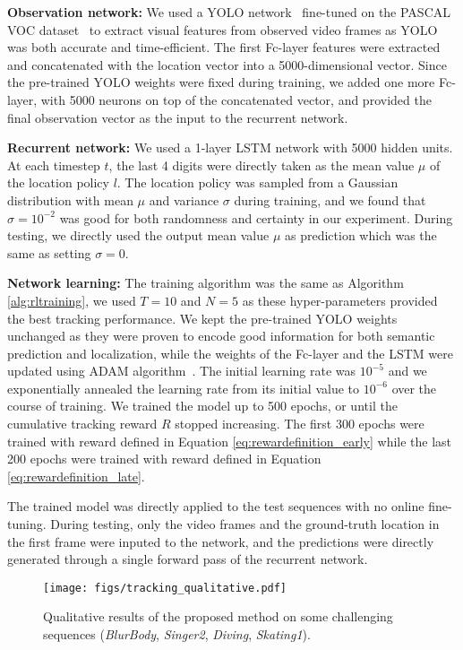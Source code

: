 \documentclass[10pt,twocolumn,letterpaper]{article}
\begin{document}
\textbf{Observation network:} We used a YOLO network~\cite{redmon2016you} fine-tuned on the PASCAL VOC dataset~\cite{pascal-voc-2012} to extract visual features from observed video frames as YOLO was both accurate and time-efficient. The first Fc-layer features were extracted and concatenated with the location vector into a 5000-dimensional vector. Since the pre-trained YOLO weights were fixed during training, we added one more Fc-layer, with 5000 neurons on top of the concatenated vector, and provided the final observation vector as the input to the recurrent network.

\textbf{Recurrent network:} We used a 1-layer LSTM network with 5000 hidden units. At each timestep $t$, the last 4 digits were directly taken as the mean value $\mu$ of the location policy $l$. The location policy was sampled from a Gaussian distribution with mean $\mu$ and variance $\sigma$ during training, and we found that $\sigma=10^{-2}$ was good for both randomness and certainty in our experiment. During testing, we directly used the output mean value $\mu$ as prediction which was the same as setting $\sigma=0$. 

\textbf{Network learning:} The training algorithm was the same as Algorithm \ref{alg:rltraining}, we used $T=10$ and $N=5$ as these hyper-parameters provided the best tracking performance. We kept the pre-trained YOLO weights unchanged as they were proven to encode good information for both semantic prediction and localization, while the weights of the Fc-layer and the LSTM were updated using ADAM algorithm~\cite{kingma2014adam}. The initial learning rate was $10^{-5}$ and we exponentially annealed the learning rate from its initial value to $10^{-6}$ over the course of training. We trained the model up to 500 epochs, or until the cumulative tracking reward $R$ stopped increasing. The first 300 epochs were trained with reward defined in Equation \ref{eq:rewardefinition_early} while the last 200 epochs were trained with reward defined in Equation \ref{eq:rewardefinition_late}.

The trained model was directly applied to the test sequences with no online fine-tuning. During testing, only the video frames and the ground-truth location in the first frame were inputed to the network, and the predictions were directly generated through a single forward pass of the recurrent network.

\begin{figure*}
\begin{center}
\texttt{[image: figs/tracking\_qualitative.pdf]}
\end{center}
   \caption{Qualitative results of the proposed method on some challenging sequences (\emph{BlurBody}, \emph{Singer2}, \emph{Diving}, \emph{Skating1}).}
\label{fig:qualitative}
\end{figure*}
\end{document}
